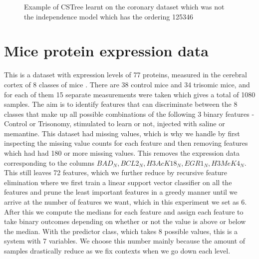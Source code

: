 \documentclass{tufte-book}
\begin{document}
\begin{figure}[!h]\label{fig:coronary1}
   \begin{floatrow}
%
\caption{Example of CSTree learnt on the coronary dataset which was not the independence model which has the ordering 125346}
        
   \end{floatrow}
\end{figure}


\section{Mice protein expression data}
\label{sec:orgcc3b358}
This is a dataset with expression levels of 77 proteins, measured in the cerebral cortex of 8 classes of mice \cite{higuera-2015-self-organ}. There are 38 control mice and 34 trisomic mice, and for each of them 15 separate measurements were taken which gives a total of 1080 samples. The aim is to identify features that can discriminate between the 8 classes that make up all possible combinations of the following 3 binary features - Control or Trisonomy, stimulated to learn or not, injected with saline or memantine. This dataset had missing values, which is why we handle by first inspecting the missing value counts for each feature and then removing features which had had 180 or more missing values. This removes the expression data corresponding to the columns \(BAD_N, BCL2_N, H3AcK18_N, EGR1_N, H3MeK4_N\). This still leaves 72 features, which we further reduce by recursive feature elimination \cite{guyon-2002} where we first train a linear support vector classifier on all the features and prune the least important features in a greedy manner until we arrive at the number of features we want, which in this experiment we set as 6. After this we compute the medians for each feature and assign each feature to take binary outcomes depending on whether or not the value is above or below the median. With the predictor class, which takes 8 possible values, this is a system with 7 variables. We choose this number mainly because the amount of samples drastically reduce as we fix contexts when we go down each level.
\end{document}
